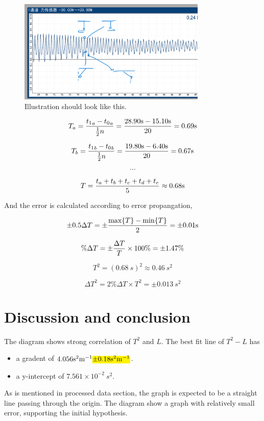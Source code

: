 \documentclass[a4paper]{article}
\begin{document}
\begin{figure}
    \centering
    \includegraphics[width=0.8\textwidth]{add.png}
    \caption{Illustration should look like this.}
\end{figure}

$$T_a = {{t_1}_a - {t_0}_a \over \frac{1}{2}n} = {28.90 \SI{}{s} - 15.10 \SI{}{s} \over 20} = 0.69 \SI{}{s}$$

$$T_b = {{t_1}_b - {t_0}_b \over \frac{1}{2}n} ={ 19.80 \SI{}{s} - 6.40 \SI{}{s} \over 20} = 0.67 \SI{}{s}$$

$$\cdots$$

$$T = {t_a + t_b + t_c + t_d + t_e \over 5} \approx 0.68 \SI{}{s}$$

And the error is calculated according to error propangation,

$$\pm 0.5 \Delta T = \pm {\max\{T\} - \min\{T\} \over 2} = \pm 0.01 \SI{}{s}$$

$$\%\Delta T = \pm {\Delta T \over T} \times 100\% = \pm 1.47\%$$

$$T^2 = (0.68 \SI{}{s})^2 \approx 0.46 \SI{}{s^2}$$

$$\Delta T^2 = 2\%\Delta T \times T^2 = \pm 0.013 \SI{}{s^2}$$

\section{Discussion and conclusion}

The diagram shows strong correlation of $T^2$ and $L$. The best fit line of $T^2 - L$ has 

\begin{itemize}
    \item a gradent of $4.056 \SI{}{s^2m^{-1}} \text{\hl{$ \pm 0.18 \SI{}{s^2m^{-1}}$}}$.
    \item a y-intercept of $7.561\times 10^{-2} \SI{}{s^2}$.
\end{itemize}

As is mentioned in processed data section, the graph is expected to be a straight line passing through the origin. The diagram show a graph with relatively small error, supporting the initial hypothesis. 
\end{document}
